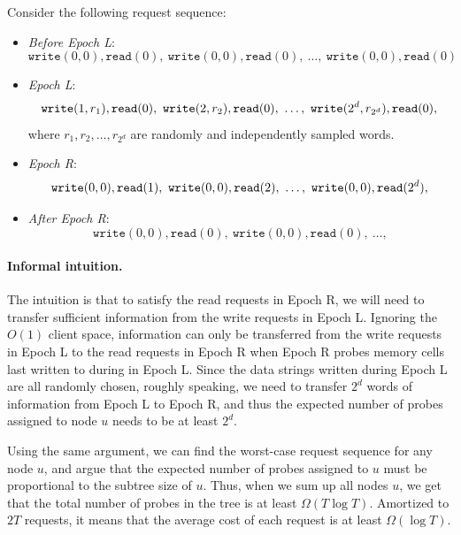 Consider the following request sequence:
\begin{itemize}[leftmargin=5mm]
\item 
{\it Before Epoch L}: 
\[\texttt{write}(0, {0}), \texttt{read}(0), \ 
\texttt{write}(0, {0}), \texttt{read}(0), \ 
\ldots, \  \texttt{write}(0, {0}), \texttt{read}(0)\]
\item 
{\it Epoch L}: 
\[\texttt{write}(1, r_1), \texttt{read}(0), \ 
\texttt{write}(2, r_2), \texttt{read}(0), \ 
\ldots,  \ 
\texttt{write}(2^d, r_{2^d}), \texttt{read}(0),\\
\]
where $r_1, r_2, \ldots,  r_{2^d}$
are randomly and independently sampled words. 
\item 
{\it Epoch R}:
\[
\texttt{write}(0, 0), \texttt{read}(1), \ 
\texttt{write}(0, 0), \texttt{read}(2), \ 
\ldots,  \ 
\texttt{write}(0, 0), \texttt{read}(2^d),\\
\]

\item 
{\it After Epoch R}:
\[
\texttt{write}(0, 0), \texttt{read}(0), \ 
\texttt{write}(0, 0), \texttt{read}(0), \ 
\ldots,  
\]
\end{itemize}



\paragraph{Informal intuition.}
The intuition is that to satisfy the read requests in %
Epoch R, 
we will need to transfer sufficient information
from the write requests in %
Epoch L.
Ignoring the %
$O(1)$ client space, 
information can only be transferred from
the write requests in %
Epoch L 
to the read requests in %
Epoch R
when %
Epoch R probes memory cells last written to 
during %
in Epoch L. 
Since the data strings written during Epoch L
are all randomly chosen,  roughly speaking, 
we need to transfer $2^d$ words of  
information from Epoch L to Epoch R, and thus
the expected number of probes assigned to node $u$
needs to be at least $2^d$.

Using the same argument, we can find the worst-case
request sequence for any node $u$, and argue
that the expected number  
of probes assigned to $u$ 
must be proportional to the subtree size of $u$.
Thus, when we sum up all nodes $u$, we get
that the total number of probes in the tree is 
at least $\Omega(T  \log T)$.
Amortized to $2T$ requests, it means that 
the average 
cost of each request 
is at least $\Omega(\log T)$.

